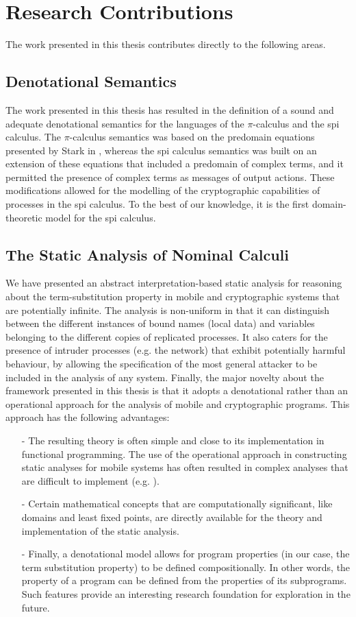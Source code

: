 \documentclass[10pt,a4paper,final,oneside,fleqn]{book}
\begin{document}
\section{Research Contributions}
The work presented in this thesis contributes directly to the following areas.
\subsection{Denotational Semantics}
The work presented in this thesis has resulted in the definition of a sound and adequate denotational semantics for the languages of the $\pi$-calculus and the spi calculus.  The $\pi$-calculus semantics was based on the predomain equations presented by Stark in \cite{stark1}, whereas the spi calculus semantics was built on an extension of these equations that included a predomain of complex terms, and it permitted the presence of complex terms as messages of output actions.  These modifications allowed for the modelling of the cryptographic capabilities of processes in the spi calculus. To the best of our knowledge, it is the first domain-theoretic model for the spi calculus.

\subsection{The Static Analysis of Nominal Calculi}
We have presented an abstract interpretation-based static analysis for reasoning about the term-substitution property in mobile and cryptographic systems that are potentially infinite.  The analysis is non-uniform in that it can distinguish between the different instances of bound names (local data) and variables belonging to the different copies of replicated processes.  It also caters for the presence of intruder processes (e.g. the network) that exhibit potentially harmful behaviour, by allowing the specification of the most general attacker to be included in the analysis of any system.  Finally, the major novelty about the framework presented in this thesis is that it adopts a denotational rather than an operational approach for the analysis of mobile and cryptographic programs.  This approach has the following advantages:
\begin{itemize}
\item[-]
The resulting theory is often simple and close to its implementation in functional programming. The use of the operational approach in constructing static analyses for mobile systems has often resulted in complex analyses that are difficult to implement (e.g. \cite{venet1}).
\item[-]
Certain mathematical concepts that are computationally significant, like domains and least fixed points, are directly available for the theory and implementation of the static analysis.
\item[-]
Finally, a denotational model allows for program properties (in our case, the term substitution property) to be defined compositionally.  In other words, the property of a program can be defined from the properties of its subprograms.  Such features provide an interesting research foundation for exploration in the future.
\end{itemize}
\end{document}
